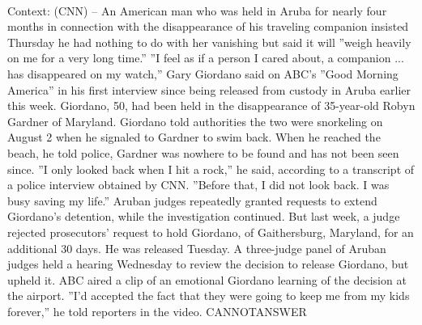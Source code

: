 \documentclass[11pt,a4paper, onecolumn]{article}
\begin{document}
\\ Context: (CNN) -- An American man who was held in Aruba for nearly four months in connection with the disappearance of his traveling companion insisted Thursday he had nothing to do with her vanishing but said it will ''weigh heavily on me for a very long time.'' ''I feel as if a person I cared about, a companion ... has disappeared on my watch,'' Gary Giordano said on ABC's ''Good Morning America'' in his first interview since being released from custody in Aruba earlier this week. Giordano, 50, had been held in the disappearance of 35-year-old Robyn Gardner of Maryland. Giordano told authorities the two were snorkeling on August 2 when he signaled to Gardner to swim back. When he reached the beach, he told police, Gardner was nowhere to be found and has not been seen since. ''I only looked back when I hit a rock,'' he said, according to a transcript of a police interview obtained by CNN. ''Before that, I did not look back. I was busy saving my life.'' Aruban judges repeatedly granted requests to extend Giordano's detention, while the investigation continued. But last week, a judge rejected prosecutors' request to hold Giordano, of Gaithersburg, Maryland, for an additional 30 days. He was released Tuesday. A three-judge panel of Aruban judges held a hearing Wednesday to review the decision to release Giordano, but upheld it. ABC aired a clip of an emotional Giordano learning of the decision at the airport. ''I'd accepted the fact that they were going to keep me from my kids forever,'' he told reporters in the video. CANNOTANSWER
\end{document}
